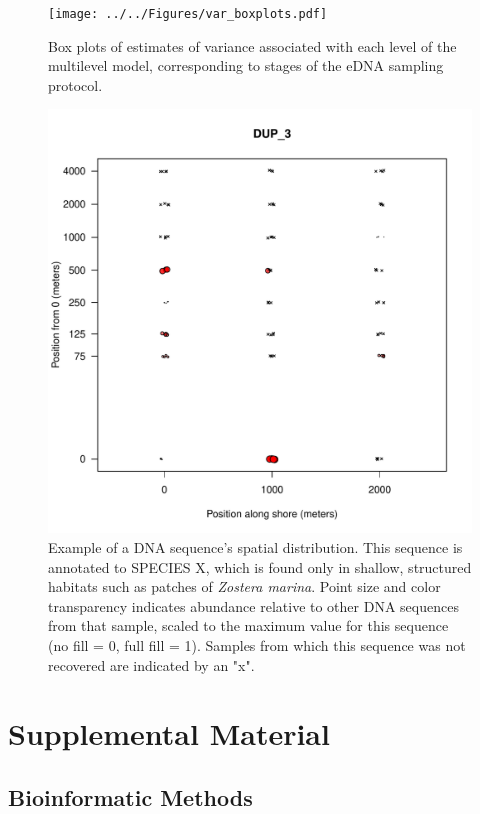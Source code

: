 \documentclass[11pt,letterpaper]{article} %
\begin{document}
\begin{figure}[h!] %
  \centering
    \texttt{[image: ../../Figures/var\_boxplots.pdf]}
    \caption{Box plots of estimates of variance associated with each level of the multilevel model, corresponding to stages of the eDNA sampling protocol.}
  \label{variance_boxplots} %
\end{figure}

\begin{figure}[h!] %
  \centering
    \includegraphics[width=1\textwidth]{../../Figures/otu_in_space.pdf}
    \caption{Example of a DNA sequence's spatial distribution. This sequence is annotated to SPECIES X, which is found only in shallow, structured habitats such as patches of \textit{Zostera marina}. Point size and color transparency indicates abundance relative to other DNA sequences from that sample, scaled to the maximum value for this sequence (no fill = 0, full fill = 1). Samples from which this sequence was not recovered are indicated by an "x".}
  \label{otu_in_space} %
\end{figure}


\section*{Supplemental Material}

\subsection*{Bioinformatic Methods}
\end{document}
